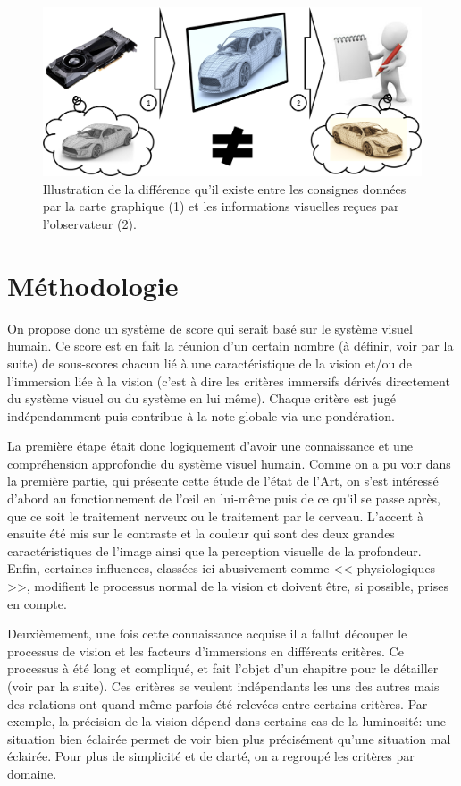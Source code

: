 	\begin{figure}
		\centering
		\includegraphics[scale=.45]{Figures/ImageBias}
		\caption{Illustration de la différence qu'il existe entre les consignes données par la carte graphique (1) et les informations visuelles reçues par l'observateur (2).}
		\label{fig:image_bias}
	\end{figure}
			
	\section{Méthodologie}
	\par On propose donc un système de score qui serait basé sur le système visuel humain. Ce score est en fait la réunion d'un certain nombre (à définir, voir par la suite) de sous-scores chacun lié à une caractéristique de la vision et/ou de l'immersion liée à la vision (c'est à dire les critères immersifs dérivés directement du système visuel ou du système en lui même). Chaque critère est jugé indépendamment puis contribue à la note globale via une pondération.
	
	\par La première étape était donc logiquement d'avoir une connaissance et une compréhension approfondie du système visuel humain. Comme on a pu voir dans la première partie, qui présente cette étude de l'état de l'Art, on s'est intéressé d'abord au fonctionnement de l'œil en lui-même puis de ce qu'il se passe après, que ce soit le traitement nerveux ou le traitement par le cerveau. L'accent à ensuite été mis sur le contraste et la couleur qui sont des deux grandes caractéristiques de l'image ainsi que la perception visuelle de la profondeur. Enfin, certaines influences, classées ici abusivement comme << physiologiques >>, modifient le processus normal de la vision et doivent être, si possible, prises en compte.
	
	\par Deuxièmement, une fois cette connaissance acquise il a fallut découper le processus de vision et les facteurs d'immersions en différents critères. Ce processus à été long et compliqué, et fait l'objet d'un chapitre pour le détailler (voir par la suite). Ces critères se veulent indépendants les uns des autres mais des relations ont quand même parfois été relevées entre certains critères. Par exemple, la précision de la vision dépend dans certains cas de la luminosité: une situation bien éclairée permet de voir bien plus précisément qu'une situation mal éclairée. Pour plus de simplicité et de clarté, on a regroupé les critères par domaine.
	
